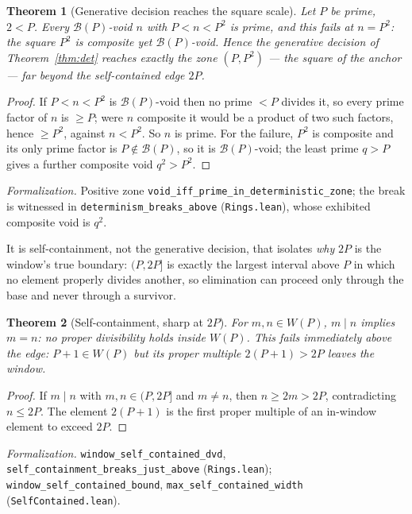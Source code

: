 \documentclass[11pt,a4paper]{amsart}
\theoremstyle{plain}
\newtheorem{theorem}{Theorem}[section]
\theoremstyle{definition}
\theoremstyle{plain}
\theoremstyle{remark}
\newcommand{\lean}[1]{\textup{\texttt{#1}}}
\newcommand{\Formal}[1]{\par\smallskip\noindent\emph{Formalization.} #1\par\smallskip}
\begin{document}
\begin{theorem}[Generative decision reaches the square scale]\label{thm:break}
Let $P$ be prime, $2<P$. Every $\mathcal{B}(P)$-void $n$ with $P<n<P^2$ is prime, and this
fails at $n=P^2$: the square $P^2$ is composite yet $\mathcal{B}(P)$-void. Hence the generative
decision of Theorem~\ref{thm:det} reaches exactly the zone $(P,P^2)$ --- the square of the
anchor --- far beyond the self-contained edge $2P$.
\end{theorem}

\begin{proof}
If $P<n<P^2$ is $\mathcal{B}(P)$-void then no prime $<P$ divides it, so every prime factor of
$n$ is $\ge P$; were $n$ composite it would be a product of two such factors, hence $\ge P^2$,
against $n<P^2$. So $n$ is prime. For the failure, $P^2$ is composite and its only prime factor
is $P\notin\mathcal{B}(P)$, so it is $\mathcal{B}(P)$-void; the least prime $q>P$ gives a
further composite void $q^2>P^2$.
\end{proof}

\Formal{Positive zone \lean{void\_iff\_prime\_in\_deterministic\_zone}; the break is witnessed
in \lean{determinism\_breaks\_above} (\lean{Rings.lean}), whose exhibited composite void is
$q^2$.}

It is self-containment, not the generative decision, that isolates \emph{why} $2P$ is the
window's true boundary: $(P,2P]$ is exactly the largest interval above $P$ in which no element
properly divides another, so elimination can proceed only through the base and never through a
survivor.

\begin{theorem}[Self-containment, sharp at $2P$]\label{thm:self}
For $m,n\in W(P)$, $m\mid n$ implies $m=n$: no proper divisibility holds inside $W(P)$.
This fails immediately above the edge: $P+1\in W(P)$ but its proper multiple
$2(P+1)>2P$ leaves the window.
\end{theorem}

\begin{proof}
If $m\mid n$ with $m,n\in(P,2P]$ and $m\ne n$, then $n\ge 2m>2P$, contradicting $n\le 2P$.
The element $2(P+1)$ is the first proper multiple of an in-window element to exceed $2P$.
\end{proof}

\Formal{\lean{window\_self\_contained\_dvd}, \lean{self\_containment\_breaks\_just\_above}
(\lean{Rings.lean}); \lean{window\_self\_contained\_bound},
\lean{max\_self\_contained\_width} (\lean{SelfContained.lean}).}
\end{document}

